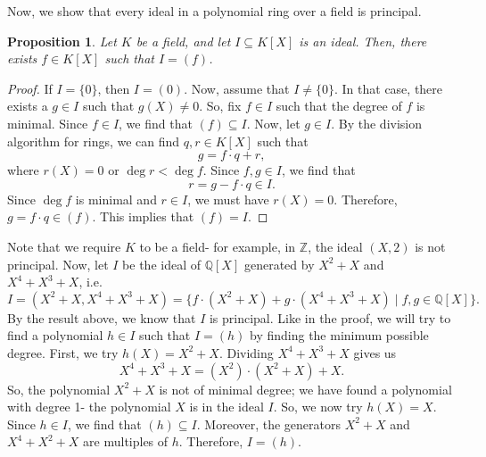 \documentclass[a4paper, openany]{memoir}
\theoremstyle{definition}
\theoremstyle{plain}
\newtheorem{proposition}[definition]{Proposition}
\begin{document}
Now, we show that every ideal in a polynomial ring over a field is principal.
\begin{proposition}
Let $K$ be a field, and let $I \subseteq K[X]$ is an ideal. Then, there exists $f \in K[X]$ such that $I = (f)$.
\end{proposition}
\begin{proof}
If $I = \{0\}$, then $I = (0)$. Now, assume that $I \neq \{0\}$. In that case, there exists a $g \in I$ such that $g(X) \neq 0$. So, fix $f \in I$ such that the degree of $f$ is minimal. Since $f \in I$, we find that $(f) \subseteq I$. Now, let $g \in I$. By the division algorithm for rings, we can find $q, r \in K[X]$ such that
\[g = f \cdot q + r,\]
where $r(X) = 0$ or $\deg r < \deg f$. Since $f, g \in I$, we find that
\[r = g - f \cdot q \in I.\]
Since $\deg f$ is minimal and $r \in I$, we must have $r(X) = 0$. Therefore, $g = f \cdot q \in (f)$. This implies that $(f) = I$.
\end{proof}
\noindent Note that we require $K$ to be a field- for example, in $\mathbb{Z}$, the ideal $(X, 2)$ is not principal. Now, let $I$ be the ideal of $\mathbb{Q}[X]$ generated by $X^2 + X$ and $X^4 + X^3 + X$, i.e.
\[I = (X^2 + X, X^4 + X^3 + X) = \{f \cdot (X^2 + X) + g \cdot (X^4 + X^3 + X) \mid f, g \in \mathbb{Q}[X]\}.\]
By the result above, we know that $I$ is principal. Like in the proof, we will try to find a polynomial $h \in I$ such that $I = (h)$ by finding the minimum possible degree. First, we try $h(X) = X^2 + X$. Dividing $X^4 + X^3 + X$ gives us
\[X^4 + X^3 + X = (X^2) \cdot (X^2 + X) + X.\]
So, the polynomial $X^2 + X$ is not of minimal degree; we have found a polynomial with degree 1- the polynomial $X$ is in the ideal $I$. So, we now try $h(X) = X$. Since $h \in I$, we find that $(h) \subseteq I$. Moreover, the generators $X^2 + X$ and $X^4 + X^2 + X$ are multiples of $h$. Therefore, $I = (h)$.
\end{document}
